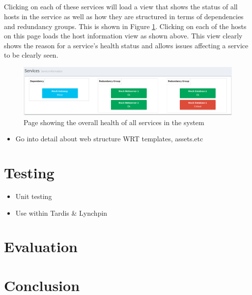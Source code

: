 \documentclass[bsc,logo,twoside]{infthesis}
\begin{document}
\paragraph*{}
	Clicking on each of these services will load a view that shows the status of
	all hosts in the service as well as how they are structured in terms of
	dependencies and redundancy groups.  This is shown in Figure
	\ref{service-information}.  Clicking on each of the hosts on this page loads
	the host information view as shown above.  This view clearly shows the reason
	for a service's health status and allows issues affecting a service to be
	clearly seen.

\begin{figure}[H]
	\centering
	\caption{Page showing the overall health of all services in the system}
	\label{service-information}
	\includegraphics[scale=0.44]{assets/screenshots/service-information.pdf}
\end{figure}

\begin{itemize}
	\item Go into detail about web structure WRT templates, assets.etc
\end{itemize}


\chapter{Testing}
\begin{itemize}
	\item Unit testing
	\item Use within Tardis \& Lynchpin
\end{itemize}

\chapter{Evaluation}

\chapter{Conclusion}
\end{document}
